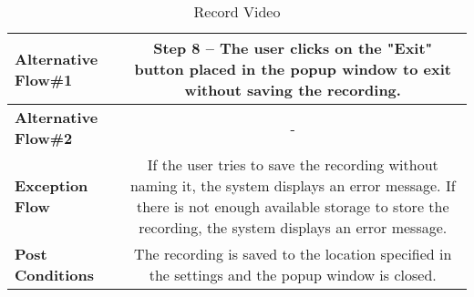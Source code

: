 \begin{table}[H]
\begin{tabular}{|l|C|}
          \textbf{Alternative Flow\#1} & 
          Step 8 -- The user clicks on the "Exit" button placed in the popup window to exit without saving the recording. \\
         \hline
          \textbf{Alternative Flow\#2} & - \\
         \hline
          \textbf{Exception Flow} & If the user tries to save the recording without naming it, the system displays an error message. If there is not enough available storage to store the recording, the system displays an error message.\\
         \hline
          \textbf{Post Conditions} & The recording is saved to the location specified in the settings and the popup window is closed. \\ 
         \hline
     \end{tabular}
     \caption{Record Video}
     \label{tab:record_video}
 \end{table}